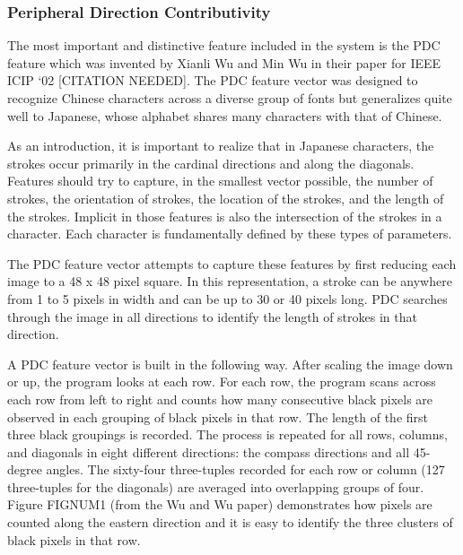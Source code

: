 \documentclass[10pt,twocolumn,letterpaper]{article}
\begin{document}
\subsubsection{Peripheral Direction Contributivity}
The most important and distinctive feature included in the system is the PDC feature which was invented by Xianli Wu and Min Wu in their paper for IEEE ICIP ‘02  [CITATION NEEDED]. The PDC feature vector was designed to recognize Chinese characters across a diverse group of fonts but generalizes quite well to Japanese, whose alphabet shares many characters with that of Chinese.

As an introduction, it is important to realize that in Japanese characters, the strokes  occur primarily in the cardinal directions and along the diagonals. Features should try to capture, in the smallest vector possible, the number of strokes, the orientation of strokes, the location of the strokes, and the length of the strokes. Implicit in those features is also the intersection of the strokes in a character. Each character is fundamentally defined by these types of parameters.

The PDC feature vector attempts to capture these features by first reducing each image to a 48 x 48 pixel square. In this representation, a stroke can be anywhere from 1 to 5 pixels in width and can be up to 30 or 40 pixels long. PDC searches through the image in all directions to identify the length of strokes in that direction.

A PDC feature vector is built in the following way. After scaling the image down or up, the program looks at each row. For each row, the program scans across each row from left to right and counts how many consecutive black pixels are observed in each grouping of black pixels in that row. The length of the first three black groupings is recorded. The process is repeated for all rows, columns, and diagonals in eight different directions: the compass directions and all 45-degree angles. The sixty-four three-tuples recorded for each row or column (127 three-tuples for the diagonals) are averaged into overlapping groups of four. Figure FIGNUM1 (from the Wu and Wu paper) demonstrates how pixels are counted along the eastern direction and it is easy to identify the three clusters of black pixels in that row.
\end{document}
